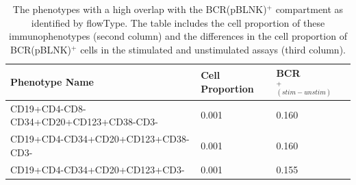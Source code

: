 
\begin{table}[ht]\footnotesize
  \begin{center}
    \caption{The phenotypes with a high overlap with the BCR(pBLNK)$^+$ compartment as identified by flowType. The table includes the cell proportion of these immunophenotypes (second column) and the differences in the cell proportion of BCR(pBLNK)$^+$ cells in the stimulated and unstimulated assays (third column).}
    \label{BCR}
    \begin{tabular}{lll}
      \hline
      Phenotype Name & Cell Proportion & BCR$^+_{(stim-unstim)}$ \\ 
      \hline
      CD19+CD4-CD8-CD34+CD20+CD123+CD38-CD3- & 0.001 & 0.160 \\ 
      CD19+CD4-CD34+CD20+CD123+CD38-CD3- & 0.001 & 0.160 \\ 
      CD19+CD4-CD34+CD20+CD123+CD3- & 0.001 & 0.155 \\ 
      \hline
    \end{tabular}
  \end{center}
\end{table}


